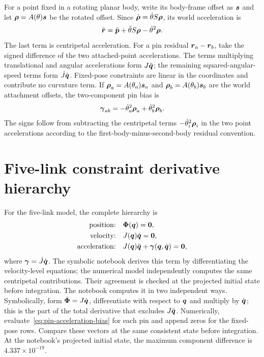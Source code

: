 \documentclass[../main.tex]{subfiles}
\begin{document}
For a point fixed in a rotating planar body, write its body-frame offset as $\boldsymbol{s}$ and let $\boldsymbol{\rho}=A(\theta)\boldsymbol{s}$ be the rotated offset. Since $\dot{\boldsymbol{\rho}}=\dot\theta S\boldsymbol{\rho}$, its world acceleration is
\begin{equation}
	\ddot{\boldsymbol{r}}
	=\ddot{\boldsymbol{p}}+\ddot\theta S\boldsymbol{\rho}-\dot\theta^2\boldsymbol{\rho}.
	\label{eq:rotating-point-acceleration}
\end{equation}
The last term is centripetal acceleration. For a pin residual $\boldsymbol{r}_a-\boldsymbol{r}_b$, take the signed difference of the two attached-point accelerations. The terms multiplying translational and angular accelerations form $J\ddot{\boldsymbol{q}}$; the remaining squared-angular-speed terms form $\dot J\dot{\boldsymbol{q}}$. Fixed-pose constraints are linear in the coordinates and contribute no curvature term.
If $\boldsymbol{\rho}_a=A(\theta_a)\boldsymbol{s}_a$ and $\boldsymbol{\rho}_b=A(\theta_b)\boldsymbol{s}_b$ are the world attachment offsets, the two-component pin bias is
\begin{equation}
\boldsymbol{\gamma}_{ab}=-\dot\theta_a^2\boldsymbol{\rho}_a+\dot\theta_b^2\boldsymbol{\rho}_b.
\label{eq:pin-acceleration-bias}
\end{equation}
The signs follow from subtracting the centripetal terms $-\dot\theta_i^2\boldsymbol{\rho}_i$ in the two point accelerations according to the first-body-minus-second-body residual convention.

\section{Five-link constraint derivative hierarchy}

For the five-link model, the complete hierarchy is
\begin{equation}
	\begin{aligned}
		\text{position:}\quad &\boldsymbol{\Phi}(\boldsymbol{q})=\boldsymbol{0},\\
		\text{velocity:}\quad &J(\boldsymbol{q})\dot{\boldsymbol{q}}=\boldsymbol{0},\\
		\text{acceleration:}\quad &J(\boldsymbol{q})\ddot{\boldsymbol{q}}
			+\boldsymbol{\gamma}(\boldsymbol{q},\dot{\boldsymbol{q}})=\boldsymbol{0},
	\end{aligned}
	\label{eq:constraint-hierarchy}
\end{equation}
where $\boldsymbol{\gamma}=\dot J\dot{\boldsymbol{q}}$. The symbolic notebook derives this term by differentiating the velocity-level equations; the numerical model independently computes the same centripetal contributions. Their agreement is checked at the projected initial state before integration.
The notebook computes it in two independent ways. Symbolically, form $\dot{\boldsymbol{\Phi}}=J\dot{\boldsymbol{q}}$, differentiate with respect to $\boldsymbol{q}$ and multiply by $\dot{\boldsymbol{q}}$; this is the part of the total derivative that excludes $J\ddot{\boldsymbol{q}}$. Numerically, evaluate~\eqref{eq:pin-acceleration-bias} for each pin and append zeros for the fixed-pose rows. Compare these vectors at the same consistent state before integration. At the notebook's projected initial state, the maximum component difference is $4.337\times10^{-19}$.
\end{document}
